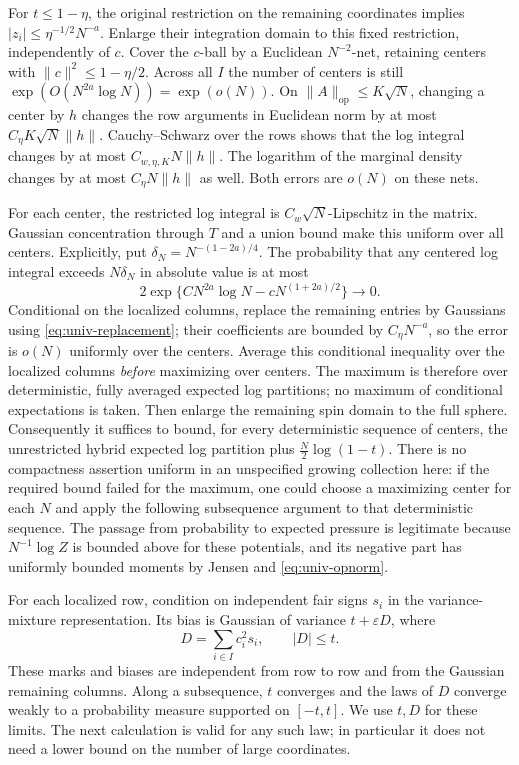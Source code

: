 \documentclass[11pt,a4paper]{article}
\numberwithin{equation}{section}
\theoremstyle{definition}
\theoremstyle{remark}
\newcommand{\eps}{\varepsilon}
\begin{document}
For $t\le1-\eta$, the original restriction on the remaining coordinates
implies $|z_i|\le\eta^{-1/2}N^{-a}$.  Enlarge their integration domain
to this fixed restriction, independently of $c$.  Cover the $c$-ball by
a Euclidean $N^{-2}$-net, retaining centers with
$\|c\|^2\le1-\eta/2$.  Across all $I$ the number of centers is still
$\exp(O(N^{2a}\log N))=\exp(o(N))$.
On $\|A\|_{\mathrm{op}}\le K\sqrt N$, changing a center by $h$
changes the row arguments in Euclidean norm by at most
$C_\eta K\sqrt N\|h\|$.  Cauchy--Schwarz over the rows shows that the
log integral changes by at most $C_{w,\eta,K}N\|h\|$.  The logarithm
of the marginal density changes by at most $C_\eta N\|h\|$ as well.
Both errors are $o(N)$ on these nets.

For each center, the restricted log integral is
$C_w\sqrt N$-Lipschitz in the matrix.  Gaussian concentration through
$T$ and a union bound make this uniform over all centers.  Explicitly, put
$\delta_N=N^{-(1-2a)/4}$.  The probability that any centered log integral
exceeds $N\delta_N$ in absolute value is at most
\[
 2\exp\{C N^{2a}\log N-cN^{(1+2a)/2}\}\longrightarrow0.
\]
Conditional on the localized columns, replace the remaining
entries by Gaussians using \eqref{eq:univ-replacement}; their coefficients
are bounded by $C_\eta N^{-a}$, so the error is $o(N)$ uniformly over the
centers.  Average this conditional inequality over the localized columns
\emph{before} maximizing over centers.  The maximum is therefore over
deterministic, fully averaged expected log partitions; no maximum of
conditional expectations is taken.  Then enlarge the remaining spin
domain to the full sphere.
Consequently it suffices to bound, for every deterministic sequence of
centers, the unrestricted hybrid expected log partition plus
$\frac N2\log(1-t)$.  There is no compactness assertion uniform in an
unspecified growing collection here: if the required bound failed for the
maximum, one could choose a maximizing center for each $N$ and apply the
following subsequence argument to that deterministic sequence.
The passage from probability to expected pressure is legitimate because
$N^{-1}\log Z$ is bounded above for these potentials, and its negative
part has uniformly bounded moments by Jensen and
\eqref{eq:univ-opnorm}.

For each localized row, condition on independent fair signs $s_i$ in the
variance-mixture representation.  Its bias is Gaussian of variance
$t+\eps D$, where
\begin{equation}\label{eq:univ-mark}
 D=\sum_{i\in I}c_i^2s_i,\qquad |D|\le t.
\end{equation}
These marks and biases are independent from row to row and from the
Gaussian remaining columns.  Along a subsequence, $t$ converges and the
laws of $D$ converge weakly to a probability measure supported on
$[-t,t]$.  We use $t,D$ for these limits.  The next calculation is valid
for any such law; in particular it does not need a lower bound on the
number of large coordinates.
\end{document}
